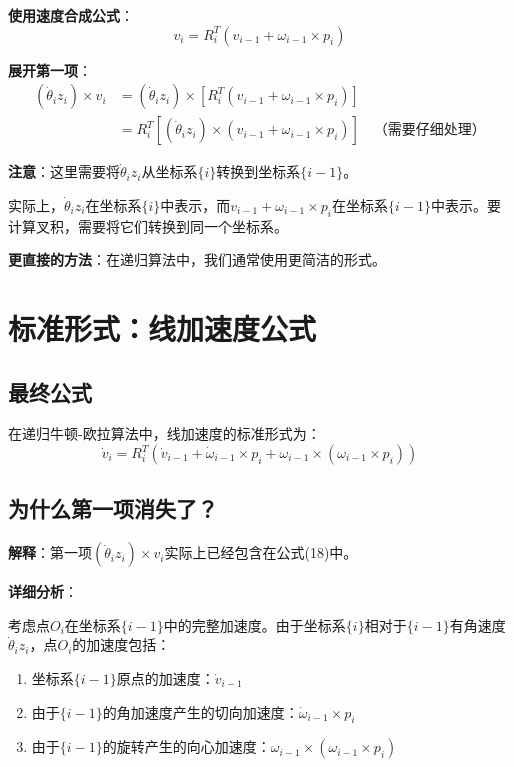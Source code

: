 \documentclass[12pt,a4paper]{article}
\begin{document}
\textbf{使用速度合成公式}：
\begin{equation}
v_i = R_i^T (v_{i-1} + \omega_{i-1} \times p_i)
\end{equation}

\textbf{展开第一项}：
\begin{align}
(\dot{\theta}_i z_i) \times v_i &= (\dot{\theta}_i z_i) \times [R_i^T (v_{i-1} + \omega_{i-1} \times p_i)] \\
&= R_i^T [(\dot{\theta}_i z_i) \times (v_{i-1} + \omega_{i-1} \times p_i)] \quad \text{（需要仔细处理）}
\end{align}

\textbf{注意}：这里需要将$\dot{\theta}_i z_i$从坐标系$\{i\}$转换到坐标系$\{i-1\}$。

实际上，$\dot{\theta}_i z_i$在坐标系$\{i\}$中表示，而$v_{i-1} + \omega_{i-1} \times p_i$在坐标系$\{i-1\}$中表示。要计算叉积，需要将它们转换到同一个坐标系。

\textbf{更直接的方法}：在递归算法中，我们通常使用更简洁的形式。

\section{标准形式：线加速度公式}

\subsection{最终公式}

在递归牛顿-欧拉算法中，线加速度的标准形式为：
\begin{equation}
\dot{v}_i = R_i^T (\dot{v}_{i-1} + \dot{\omega}_{i-1} \times p_i + \omega_{i-1} \times (\omega_{i-1} \times p_i)) \tag{18}
\end{equation}

\subsection{为什么第一项消失了？}

\textbf{解释}：第一项$(\dot{\theta}_i z_i) \times v_i$实际上已经包含在公式(18)中。

\textbf{详细分析}：

考虑点$O_i$在坐标系$\{i-1\}$中的完整加速度。由于坐标系$\{i\}$相对于$\{i-1\}$有角速度$\dot{\theta}_i z_i$，点$O_i$的加速度包括：

\begin{enumerate}
\item 坐标系$\{i-1\}$原点的加速度：$\dot{v}_{i-1}$
\item 由于$\{i-1\}$的角加速度产生的切向加速度：$\dot{\omega}_{i-1} \times p_i$
\item 由于$\{i-1\}$的旋转产生的向心加速度：$\omega_{i-1} \times (\omega_{i-1} \times p_i)$
\end{enumerate}
\end{document}
